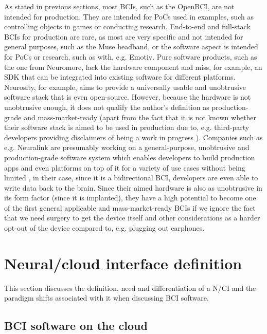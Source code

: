 As stated in previous sections, most BCIs, such as the OpenBCI, are not intended for production. They are intended for PoCs used in examples, such as controlling objects in games or conducting research. End-to-end and full-stack BCIs for production are rare, as most are very specific and not intended for general purposes, such as the Muse headband, or the software aspect is intended for PoCs or research, such as with, e.g. Emotiv. Pure software products, such as the one from Neuromore, lack the hardware component and miss, for example, an SDK that can be integrated into existing software for different platforms. Neurosity, for example, aims to provide a universally usable and unobtrusive software stack that is even open-source. However, because the hardware is not unobtrusive enough, it does not qualify the author's definition as production-grade and mass-market-ready (apart from the fact that it is not known whether their software stack is aimed to be used in production \citep{neurosity_neurosity_2022} due to, e.g. third-party developers providing disclaimers of being a work in progress \citep{turney_notion_2022}). Companies such as e.g. Neuralink are presumably working on a general-purpose, unobtrusive and production-grade software system which enables developers to build production apps and even platforms on top of it for a variety of use cases without being limited \citep{musk_integrated_2019}, in their case, since it is a bidirectional BCI, developers are even able to write data back to the brain. Since their aimed hardware is also as unobtrusive in its form factor (since it is implanted), they have a high potential to become one of the first general applicable and mass-market-ready BCIs if we ignore the fact that we need surgery to get the device itself \citep{neuralink_approach_nodate} and other considerations as a harder opt-out of the device compared to, e.g. plugging out earphones.

\section{Neural/cloud interface definition}
\label{chapter2-neural-cloud-interface-definition}

This section discusses the definition, need and differentiation of a N/CI and the paradigm shifts associated with it when discussing BCI software.

\subsection{BCI software on the cloud}
\label{chapter2-bci-software-on-the-cloud}

